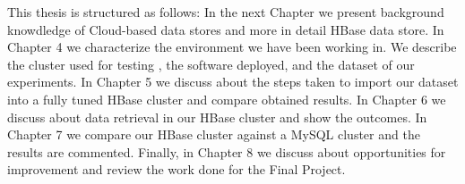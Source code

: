 \bigskip

This thesis is structured as follows: In the next Chapter we present background knowdledge of Cloud-based data stores and more in detail HBase data store. In Chapter 4 we characterize the environment we have been working in. We describe the cluster used for testing , the software deployed, and the dataset of our experiments. In Chapter 5 we discuss about the steps taken to import our dataset into a fully tuned HBase cluster and compare obtained results. In Chapter 6 we discuss about data retrieval in our HBase cluster and show the outcomes. In Chapter 7 we compare our HBase cluster against a MySQL cluster and the results are commented. Finally, in Chapter 8 we discuss about opportunities for improvement and review the work done for the Final Project.

